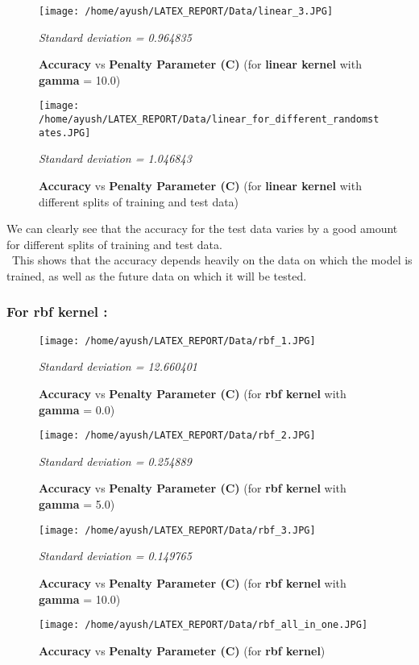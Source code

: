\documentclass{report}
\begin{document}
\begin{figure}[!h]
  \texttt{[image: /home/ayush/LATEX\_REPORT/Data/linear\_3.JPG]}
  \caption{\textbf{Accuracy }vs\textbf{ Penalty Parameter (C)} (for \textbf{linear kernel} with \textbf{gamma} = 10.0)}
  \label{fig:}
  \emph{\normalsize Standard deviation = 0.964835}
\end{figure}

\pagebreak
\begin{figure}[!h]
  \texttt{[image: /home/ayush/LATEX\_REPORT/Data/linear\_for\_different\_randomstates.JPG]}
  \caption{\textbf{Accuracy }vs\textbf{ Penalty Parameter (C)} (for \textbf{linear kernel} with different splits of training and test data)}
  \label{fig:}
  \emph{\normalsize Standard deviation = 1.046843}
\end{figure}

We can clearly see that the accuracy for the test data varies by a good amount for different splits of training and test data.\\
\linebreak
\ This shows that the accuracy depends heavily on the data on which the model is trained, as well as the future data on which it will be tested. 


\subsubsection{\textbf \Large  {For rbf kernel :}}
\begin{figure}[!h]
  \texttt{[image: /home/ayush/LATEX\_REPORT/Data/rbf\_1.JPG]}
  \caption{\textbf{Accuracy }vs\textbf{ Penalty Parameter (C)} (for \textbf{rbf kernel} with \textbf{gamma} = 0.0)}
  \label{fig:}
  \emph{\normalsize Standard deviation = 12.660401}
\end{figure}
\pagebreak
\begin{figure}[!h]
  \texttt{[image: /home/ayush/LATEX\_REPORT/Data/rbf\_2.JPG]}
  \caption{\textbf{Accuracy }vs\textbf{ Penalty Parameter (C)} (for \textbf{rbf kernel} with \textbf{gamma} = 5.0)}
  \label{fig:}
  \emph{\normalsize Standard deviation = 0.254889}
\end{figure}

\begin{figure}[!h]
  \texttt{[image: /home/ayush/LATEX\_REPORT/Data/rbf\_3.JPG]}
  \caption{\textbf{Accuracy }vs\textbf{ Penalty Parameter (C)} (for \textbf{rbf kernel} with \textbf{gamma} = 10.0)}
  \label{fig:}
  \emph{\normalsize Standard deviation = 0.149765}
\end{figure}
\pagebreak
\begin{figure}[!h]
  \texttt{[image: /home/ayush/LATEX\_REPORT/Data/rbf\_all\_in\_one.JPG]}
  \caption{\textbf{Accuracy }vs\textbf{ Penalty Parameter (C)} (for \textbf{rbf kernel})}
  \label{fig:}
\end{figure}
\end{document}
